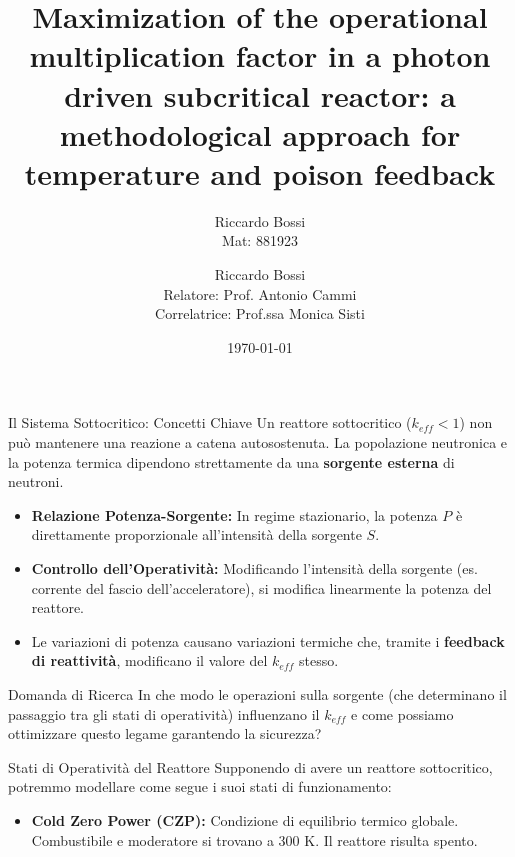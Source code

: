 \documentclass[aspectratio=169]{beamer} %
\title[Ottimizzazione Reattore Sottocritico]{Maximization of the operational multiplication factor in a photon driven subcritical reactor: a methodological approach for temperature and poison feedback }
\author[R. Bossi]{Riccardo Bossi \\ \small Mat: 881923}
\institute[PoliMi \& Bicocca]{Università degli Studi di Milano-Bicocca \\ Politecnico di Milano}
\author[R. Bossi]{
  Riccardo Bossi \\ \medskip
  {\small Relatore: Prof. Antonio Cammi} \\
  {\small Correlatrice: Prof.ssa Monica Sisti}
}
\date{\today}
\begin{document}
\begin{frame}
  \titlepage
\end{frame}
\begin{frame}{Il Sistema Sottocritico: Concetti Chiave}
    Un reattore sottocritico ($k_{eff} < 1$) non può mantenere una reazione a catena autosostenuta. La popolazione neutronica e la potenza termica dipendono strettamente da una \textbf{sorgente esterna} di neutroni.

    \vspace{0.4cm}
    \begin{itemize}
        \item \textbf{Relazione Potenza-Sorgente:} In regime stazionario, la potenza $P$ è direttamente proporzionale all'intensità della sorgente $S$.
        \item \textbf{Controllo dell'Operatività:} Modificando l'intensità della sorgente (es. corrente del fascio dell'acceleratore), si modifica linearmente la potenza del reattore.
        \item Le variazioni di potenza causano variazioni termiche che, tramite i \textbf{feedback di reattività}, modificano il valore del $k_{eff}$ stesso.
    \end{itemize}

    \vspace{0.3cm}
    \begin{exampleblock}{Domanda di Ricerca}
        In che modo le operazioni sulla sorgente (che determinano il passaggio tra gli stati di operatività) influenzano il $k_{eff}$ e come possiamo ottimizzare questo legame garantendo la sicurezza?
    \end{exampleblock}
\end{frame}

\begin{frame}{Stati di Operatività del Reattore}
    Supponendo di avere un reattore sottocritico, potremmo modellare come segue i suoi stati di funzionamento:
    
    \vspace{0.3cm}
    \begin{itemize}
        \item \textbf{Cold Zero Power (CZP):} Condizione di equilibrio termico globale. Combustibile e moderatore si trovano a $300 \text{ K}$. Il reattore risulta spento.
    \end{itemize}
\end{frame}
\end{document}
